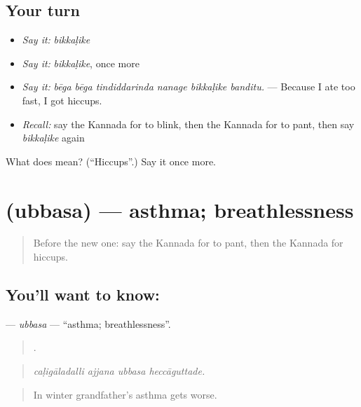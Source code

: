 \subsection*{Your turn}
\begin{itemize}
\raggedright
  \item \emph{Say it:} \emph{bikkaḷike}
  \item \emph{Say it:} \emph{bikkaḷike}, once more
  \item \emph{Say it:} \emph{bēga bēga tindiddarinda nanage bikkaḷike banditu.} — Because I ate too fast, I got hiccups.
  \item \emph{Recall:} say the Kannada for to blink, then the Kannada for to pant, then say \emph{bikkaḷike} again
\end{itemize}

\begin{tcolorbox}[breakable,colback=teal!4,colframe=teal!35!black,title={Before you move on}]
What does  mean? (\textquotedblleft{}Hiccups\textquotedblright{}.) Say it once more.
\end{tcolorbox}
\section[\texorpdfstring{\kn{ಉಬ್ಬಸ} (ubbasa)}{ಉಬ್ಬಸ (ubbasa)}]{ (ubbasa) — asthma; breathlessness}

\label{lesson:KA-C507-ubbasa}



\begin{quote}
Before the new one: say the Kannada for to pant, then the Kannada for hiccups.
\end{quote}

\subsection*{You'll want to know: }
\textbf{} — \emph{ubbasa} — \textquotedblleft{}asthma; breathlessness\textquotedblright{}.

\begin{quote}
   .
\end{quote}

\begin{quote}
\emph{caḷigāladalli ajjana ubbasa heccāguttade.}
\end{quote}

\begin{quote}
In winter grandfather's asthma gets worse.
\end{quote}


